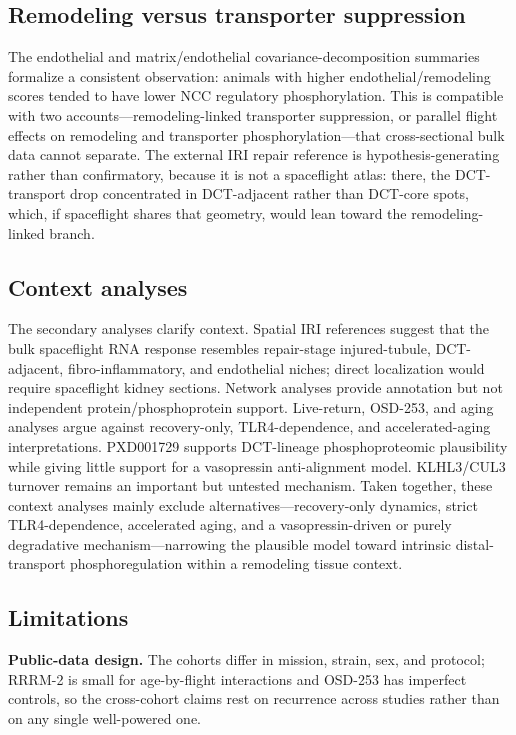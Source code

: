 \documentclass[11pt]{article}
\begin{document}
\subsection{Remodeling versus transporter suppression}

The endothelial and matrix/endothelial covariance-decomposition summaries formalize a consistent observation: animals with higher endothelial/remodeling scores tended to have lower NCC regulatory phosphorylation. This is compatible with two accounts---remodeling-linked transporter suppression, or parallel flight effects on remodeling and transporter phosphorylation---that cross-sectional bulk data cannot separate. The external IRI repair reference is hypothesis-generating rather than confirmatory, because it is not a spaceflight atlas: there, the DCT-transport drop concentrated in DCT-adjacent rather than DCT-core spots, which, if spaceflight shares that geometry, would lean toward the remodeling-linked branch.

\subsection{Context analyses}

The secondary analyses clarify context. Spatial IRI references suggest that the bulk spaceflight RNA response resembles repair-stage injured-tubule, DCT-adjacent, fibro-inflammatory, and endothelial niches; direct localization would require spaceflight kidney sections. Network analyses provide annotation but not independent protein/phosphoprotein support. Live-return, OSD-253, and aging analyses argue against recovery-only, TLR4-dependence, and accelerated-aging interpretations. PXD001729 supports DCT-lineage phosphoproteomic plausibility while giving little support for a vasopressin anti-alignment model. KLHL3/CUL3 turnover remains an important but untested mechanism. Taken together, these context analyses mainly exclude alternatives---recovery-only dynamics, strict TLR4-dependence, accelerated aging, and a vasopressin-driven or purely degradative mechanism---narrowing the plausible model toward intrinsic distal-transport phosphoregulation within a remodeling tissue context.

\subsection{Limitations}

\textbf{Public-data design.} The cohorts differ in mission, strain, sex, and protocol; RRRM-2 is small for age-by-flight interactions and OSD-253 has imperfect controls, so the cross-cohort claims rest on recurrence across studies rather than on any single well-powered one.
\end{document}
